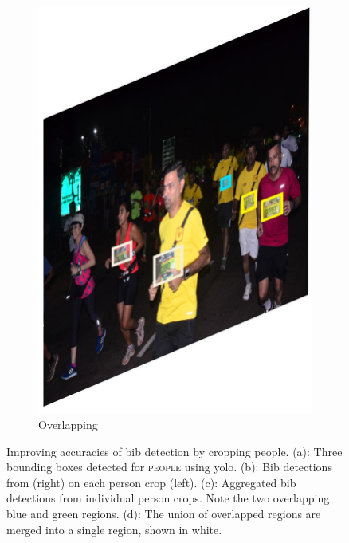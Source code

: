 \begin{landscape}
\begin{figure}[p]
\begin{subfigure}[b]{0.23\paperwidth}
      \includegraphics[width=\textwidth]{images/processing/yolo_crop_unioned_detections}
      \caption{Overlapping}
      \label{fig:processing_pipeline:person_filtering:yolo_crop_unioned_detections}
    \end{subfigure}
    \caption[Person filter using YOLO to improve accuracies of bib detection]{Improving accuracies of bib detection by cropping people. (a): Three bounding boxes detected for \textsc{people} using \gls{yolo}. (b): Bib detections from \frcnn{} (right) on each person crop (left). (c): Aggregated bib detections from individual person crops. Note the two overlapping blue and green regions. (d): The union of overlapped regions are merged into a single region, shown in white.}
    \label{fig:processing_pipeline:person_filtering}
  \end{figure}
\end{landscape}



